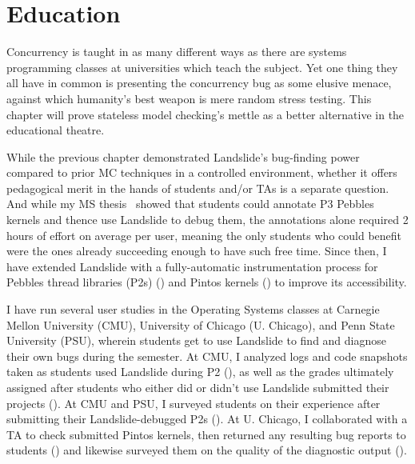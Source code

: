 \chapter{Education}
\label{chap:education}


Concurrency is taught in as many different ways as there are
systems programming classes at universities which teach the subject.
Yet one thing they all have in common is presenting the concurrency bug
as some elusive menace,
against which humanity's best weapon is mere random stress testing.
This chapter will prove stateless model checking's mettle as a better alternative in the educational theatre.

While the previous chapter demonstrated Landslide's bug-finding power
compared to prior MC techniques in a controlled environment,
whether it offers pedagogical merit in the hands of students and/or TAs is a separate question.
And while my MS thesis~\cite{landslide} showed that students
could annotate P3 Pebbles kernels and thence use Landslide to debug them,
the annotations alone required 2 hours of effort on average per user,
meaning the only students who could benefit were the ones already succeeding enough to have such free time.
Since then, I have extended Landslide with a fully-automatic instrumentation process
for Pebbles thread libraries (P2s) (\sect{\ref{sec:education-pebbles-instrumentation}})
and Pintos kernels (\sect{\ref{sec:education-pintos-instrumentation}})
to improve its accessibility.

I have run several user studies in the Operating Systems classes
at Carnegie Mellon University (CMU), University of Chicago (U. Chicago), and Penn State University (PSU),
wherein students get to use Landslide to find and diagnose their own bugs during the semester.
At CMU, I analyzed logs and code snapshots taken as students used Landslide during P2
(\sect{\ref{sec:education-eval-bugfinding}}),
as well as the grades ultimately assigned after students who either did or didn't use Landslide submitted their projects
(\sect{\ref{sec:education-eval-grades}}).
At CMU and PSU, I surveyed students on their experience after submitting their Landslide-debugged P2s
(\sect{\ref{sec:education-eval-survey}}).
At U. Chicago, I collaborated with a TA to check submitted Pintos kernels,
then returned any resulting bug reports to students
(\sect{\ref{sec:education-eval-bugfinding}})
and likewise surveyed them on the quality of the diagnostic output
(\sect{\ref{sec:education-eval-survey}}).

